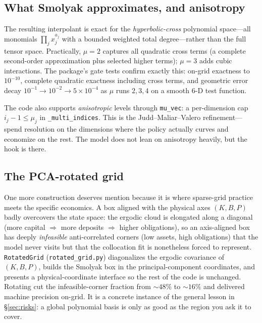 \documentclass[11pt]{article}
\newcommand{\code}[1]{\texttt{#1}}
\begin{document}
\subsection{What Smolyak approximates, and anisotropy}

The resulting interpolant is exact for the \emph{hyperbolic-cross} polynomial
space---all monomials $\prod_j x_j^{a_j}$ with a bounded weighted total
degree---rather than the full tensor space. Practically, $\mu=2$ captures
all quadratic cross terms (a complete second-order approximation plus
selected higher terms); $\mu=3$ adds cubic interactions. The package's gate
tests confirm exactly this: on-grid exactness to $10^{-10}$, complete
quadratic exactness including cross terms, and geometric error decay
$10^{-1}\!\to\!10^{-2}\!\to\!5\times10^{-4}$ as $\mu$ runs $2,3,4$ on a
smooth 6-D test function.

The code also supports \emph{anisotropic} levels through \code{mu\_vec}: a
per-dimension cap $i_j-1\le \mu_j$ in \code{\_multi\_indices}. This is the
Judd--Maliar--Valero refinement---spend resolution on the dimensions where
the policy actually curves and economize on the rest. The model does not
lean on anisotropy heavily, but the hook is there.

\subsection{The PCA-rotated grid}
\label{sec:rotated}

One more construction deserves mention because it is where sparse-grid
practice meets the specific economics. A box aligned with the physical axes
$(K,B,P)$ badly overcovers the state space: the ergodic cloud is elongated
along a diagonal (more capital $\Rightarrow$ more deposits $\Rightarrow$
higher obligations), so an axis-aligned box has deeply \emph{infeasible}
anti-correlated corners (low assets, high obligations) that the model never
visits but that the collocation fit is nonetheless forced to represent.
\code{RotatedGrid} (\code{rotated\_grid.py}) diagonalizes the ergodic
covariance of $(K,B,P)$, builds the Smolyak box in the principal-component
coordinates, and presents a physical-coordinate interface so the rest of the
code is unchanged. Rotating cut the infeasible-corner fraction from
$\sim48\%$ to $\sim16\%$ and delivered machine precision on-grid. It is a
concrete instance of the general lesson in \S\ref{sec:risks}: a global
polynomial basis is only as good as the region you ask it to cover.
\end{document}
